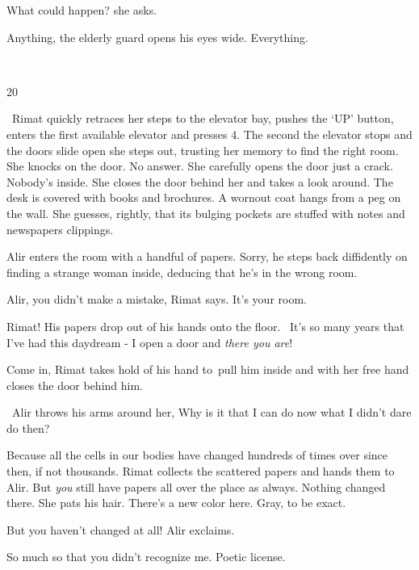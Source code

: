 \documentclass[letterpaper]{article}
\begin{document}
{\textquotedbl}What could happen?{\textquotedbl} she asks.

{\textquotedbl}Anything,{\textquotedbl} the elderly guard opens his eyes wide. {\textquotedbl}Everything.{\textquotedbl}

~

20~

~Rimat quickly retraces her steps to the elevator bay, pushes the `UP' button, enters the first available elevator and
presses 4. The second the elevator stops and the doors slide open she steps out, trusting her memory to find the right
room. She knocks on the door. No answer. She carefully opens the door just a crack. Nobody's inside. She closes the
door behind her and takes a look around. The desk is covered with books and brochures. A wornout coat hangs from a peg
on the wall. She guesses, rightly, that its bulging pockets are stuffed with notes and\textcolor{red}{ }newspapers
clippings. 

Alir enters the room with a handful of papers. {\textquotedbl}Sorry,{\textquotedbl} he steps back diffidently on finding
a strange woman inside, deducing that he's in the wrong room. 

{\textquotedbl}Alir, you didn't make a mistake,{\textquotedbl} Rimat says. {\textquotedbl}It's your room.{\textquotedbl}


{\textquotedbl}Rimat!{\textquotedbl} His papers drop out of his hands onto the floor.~ {\textquotedbl}It's so many years
that I've had this daydream - I open a door and \textit{there you are}!{\textquotedbl}

{\textquotedbl}Come in,{\textquotedbl} Rimat takes hold of his hand to~pull him inside and with her free hand closes the
door behind him. 

~Alir throws his arms around her, {\textquotedbl}Why is it that I can do now what I didn't dare do then?{\textquotedbl}

{\textquotedbl}Because all the cells in our bodies have changed hundreds of times over since then, if not
thousands.{\textquotedbl} Rimat collects the scattered papers and hands them to Alir. {\textquotedbl}But \textit{you}
still have papers all over the place as always. Nothing changed there.{\textquotedbl} She pats his hair.
{\textquotedbl}There's a new color here. Gray, to be exact.{\textquotedbl} 

{\textquotedbl}But you haven't changed at all!{\textquotedbl} Alir exclaims.

{\textquotedbl}So much so that you didn't recognize me. Poetic license.{\textquotedbl} 
\end{document}
